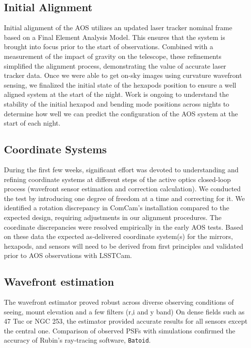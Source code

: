 \subsection{Initial Alignment}
Initial alignment of the AOS utilizes an updated laser tracker nominal frame based on a Final Element Analysis Model.  This ensures that the system is brought into focus prior to the start of observations.  Combined with a measurement of the impact of gravity on the telescope, these refinements simplified the alignment process, demonstrating the value of accurate laser tracker data. Once we were able to get on-sky images using curvature wavefront sensing, we finalized the initial state of the hexapods position to ensure a well aligned system at the start of the night. Work is ongoing to understand the stability of the initial hexapod and bending mode positions across nights to determine how well we can predict the configuration of the AOS system at the start of each night. 


\subsection{Coordinate Systems}
During the first few weeks, significant effort was devoted to understanding and refining coordinate systems at different steps of the active optics closed-loop process (wavefront sensor estimation and correction calculation). We conducted the test by introducing one degree of freedom at a time and correcting for it. We identified a rotation discrepancy in ComCam's installation compared to the expected design, requiring 
adjustments in our alignment procedures. The coordinate discrepancies were resolved empirically in the early AOS tests. Based on these data the expected as-delivered coordinate system(s) for the mirrors, hexapods, and sensors will need to be derived from first principles and validated prior to AOS observations with LSSTCam.


\subsection{Wavefront estimation}
The wavefront estimator proved robust across diverse observing conditions of seeing, mount elevation and a few filters (r,i and y band) 
On dense fields such as 47 Tuc or NGC 253, the estimator provided accurate results for all sensors except the central one.  Comparison of observed PSFs with simulations confirmed the accuracy of Rubin's ray-tracing software, \texttt{Batoid}.

